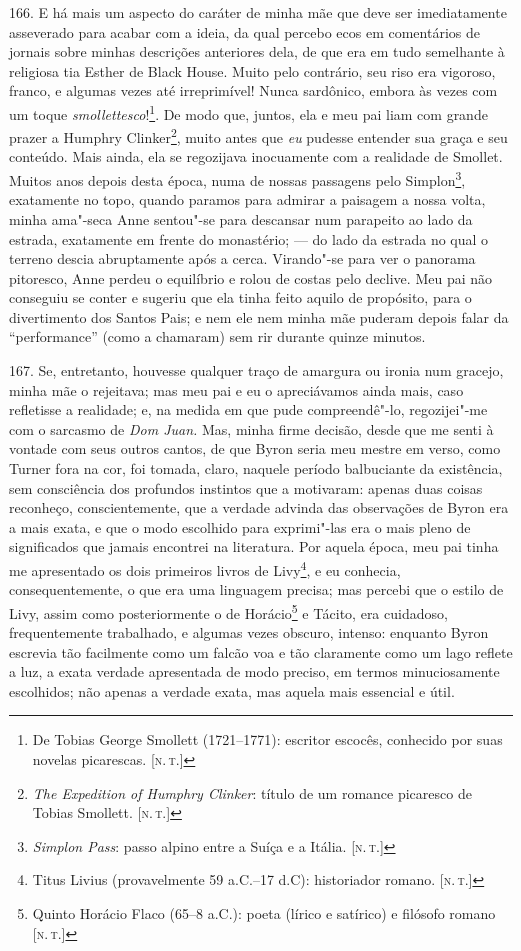 166. E há mais um aspecto do caráter de minha mãe que deve ser
imediatamente asseverado para acabar com a ideia, da qual percebo ecos
em comentários de jornais sobre minhas descrições anteriores dela, de
que era em tudo semelhante à religiosa tia Esther de Black House. Muito
pelo contrário, seu riso era vigoroso, franco, e algumas vezes até
irreprimível! Nunca sardônico, embora às vezes com um toque
\emph{smollettesco}!\footnote{De Tobias George Smollett (1721--1771):
  escritor escocês, conhecido por suas novelas picarescas. {[}\textsc{n.\,t.}{]}}. De modo que, juntos, ela e meu pai liam com grande prazer a
Humphry Clinker\footnote{\emph{The Expedition of Humphry Clinker}:
  título de um romance picaresco de Tobias Smollett. {[}\textsc{n.\,t.}{]}},
muito antes que \emph{eu} pudesse entender sua graça e seu conteúdo.
Mais ainda, ela se regozijava inocuamente com a realidade de Smollet.
Muitos anos depois desta época, numa de nossas passagens pelo
Simplon\footnote{\emph{Simplon Pass}: passo alpino entre a Suíça e a
  Itália. {[}\textsc{n.\,t.}{]}}, exatamente no topo, quando paramos para
admirar a paisagem a nossa volta, minha ama"-seca Anne sentou"-se para
descansar num parapeito ao lado da estrada, exatamente em frente do
monastério; --- do lado da estrada no qual o terreno descia abruptamente
após a cerca. Virando"-se para ver o panorama pitoresco, Anne perdeu o
equilíbrio e rolou de costas pelo declive. Meu pai não conseguiu se
conter e sugeriu que ela tinha feito aquilo de propósito, para o
divertimento dos Santos Pais; e nem ele nem minha mãe puderam depois
falar da ``performance'' (como a chamaram) sem rir durante quinze
minutos.

167. Se, entretanto, houvesse qualquer traço de amargura ou ironia num
gracejo, minha mãe o rejeitava; mas meu pai e eu o apreciávamos ainda
mais, caso refletisse a realidade; e, na medida em que pude
compreendê"-lo, regozijei"-me com o sarcasmo de \emph{Dom Juan.} Mas,
minha firme decisão, desde que me senti à vontade com seus outros
cantos, de que Byron seria meu mestre em verso, como Turner fora na cor,
foi tomada, claro, naquele período balbuciante da existência, sem
consciência dos profundos instintos que a motivaram: apenas duas coisas
reconheço, conscientemente, que a verdade advinda das observações de
Byron era a mais exata, e que o modo escolhido para exprimi"-las era o
mais pleno de significados que jamais encontrei na literatura. Por
aquela época, meu pai tinha me apresentado os dois primeiros livros de
Livy\footnote{Titus Livius (provavelmente 59 a.C.--17 d.C):
  historiador romano. {[}\textsc{n.\,t.}{]}}, e eu conhecia, consequentemente,
o que era uma linguagem precisa; mas percebi que o estilo de Livy, assim
como posteriormente o de Horácio\footnote{Quinto Horácio Flaco (65--8 a.C.): poeta (lírico e satírico) e filósofo romano {[}\textsc{n.\,t.}{]}} e Tácito, era cuidadoso, frequentemente trabalhado, e algumas
vezes obscuro, intenso: enquanto Byron escrevia tão facilmente como um
falcão voa e tão claramente como um lago reflete a luz, a exata verdade
apresentada de modo preciso, em termos minuciosamente escolhidos; não
apenas a verdade exata, mas aquela mais essencial e útil.

